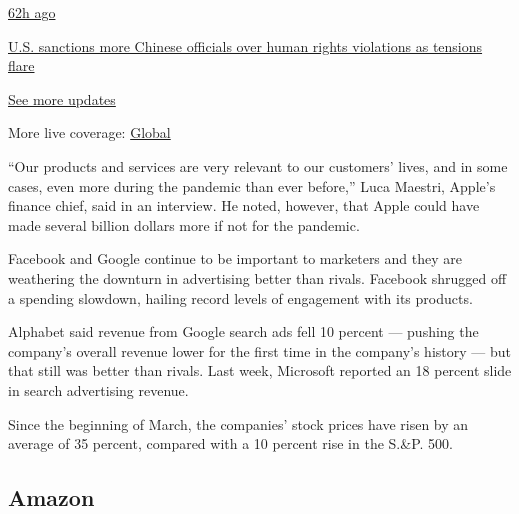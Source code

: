 \href{https://www.nytimes3xbfgragh.onion/live/2020/07/31/business/stock-market-today-coronavirus?action=click\&pgtype=Article\&state=default\&region=MAIN_CONTENT_1\&context=storylines_live_updates\#us-sanctions-more-chinese-officials-over-human-rights-violations-as-tensions-flare}{62h
ago}

\href{https://www.nytimes3xbfgragh.onion/live/2020/07/31/business/stock-market-today-coronavirus?action=click\&pgtype=Article\&state=default\&region=MAIN_CONTENT_1\&context=storylines_live_updates\#us-sanctions-more-chinese-officials-over-human-rights-violations-as-tensions-flare}{U.S.
sanctions more Chinese officials over human rights violations as
tensions flare}

\href{https://www.nytimes3xbfgragh.onion/live/2020/07/31/business/stock-market-today-coronavirus?action=click\&pgtype=Article\&state=default\&region=MAIN_CONTENT_1\&context=storylines_live_updates}{See
more updates}

More live coverage:
\href{https://www.nytimes3xbfgragh.onion/2020/08/01/world/coronavirus-covid-19.html?action=click\&pgtype=Article\&state=default\&region=MAIN_CONTENT_1\&context=storylines_live_updates}{Global}

``Our products and services are very relevant to our customers' lives,
and in some cases, even more during the pandemic than ever before,''
Luca Maestri, Apple's finance chief, said in an interview. He noted,
however, that Apple could have made several billion dollars more if not
for the pandemic.

Facebook and Google continue to be important to marketers and they are
weathering the downturn in advertising better than rivals. Facebook
shrugged off a spending slowdown, hailing record levels of engagement
with its products.

Alphabet said revenue from Google search ads fell 10 percent --- pushing
the company's overall revenue lower for the first time in the company's
history --- but that still was better than rivals. Last week, Microsoft
reported an 18 percent slide in search advertising revenue.

Since the beginning of March, the companies' stock prices have risen by
an average of 35 percent, compared with a 10 percent rise in the S.\&P.
500.

\hypertarget{amazon}{%
\subsection{Amazon}\label{amazon}}

